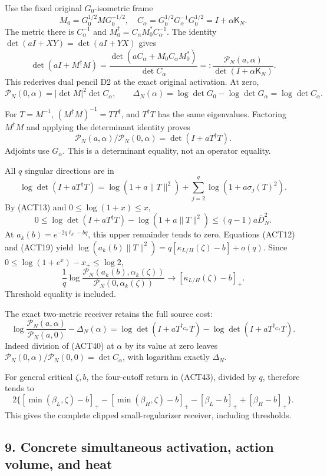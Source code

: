 \documentclass[11pt]{article}
\begin{document}
Use the fixed original \(G_0\)-isometric frame \[
M_0=G_0^{1/2}MG_0^{-1/2},\quad
C_\alpha=G_0^{1/2}G_\alpha^{-1}G_0^{1/2}=I+\alpha\mathsf K_N.
\] The metric there is \(C_\alpha^{-1}\) and \(M_0^\dagger=C_\alpha M_0^*C_\alpha^{-1}\). The identity \(\det(aI+XY)=\det(aI+YX)\) gives \[
\det(aI+M^\dagger M)
=\frac{\det(aC_\alpha+M_0C_\alpha M_0^*)}{\det C_\alpha}
=:\frac{\mathscr P_N(a,\alpha)}{\det(I+\alpha\mathsf K_N)}.
\tag{ACT38}
\] This rederives dual pencil D2 at the exact original activation. At zero, \[
\mathscr P_N(0,\alpha)=|\det M|^2\det C_\alpha,\qquad
\Delta_N(\alpha)=\log\det G_0-\log\det G_\alpha=\log\det C_\alpha.
\tag{ACT39}
\]

For \(T=M^{-1}\), \((M^\dagger M)^{-1}=TT^\dagger\), and \(T^\dagger T\) has the same eigenvalues. Factoring \(M^\dagger M\) and applying the determinant identity proves \[
\boxed{\mathscr P_N(a,\alpha)/\mathscr P_N(0,\alpha)=\det(I+aT^\dagger T).}
\tag{ACT40}
\] Adjoints use \(G_\alpha\). This is a determinant equality, not an operator equality.

All \(q\) singular directions are in \[
\log\det(I+aT^\dagger T)=\log(1+a\|T\|^2)
 +\sum_{j=2}^q\log(1+a\sigma_j(T)^2).
\] By (ACT13) and \(0\le\log(1+x)\le x\), \[
0\le\log\det(I+aT^\dagger T)-\log(1+a\|T\|^2)
\le(q-1)a\overline D_N^2.
\tag{ACT41}
\] At \(a_k(b)=e^{-2q\ell_k-bq}\), this upper remainder tends to zero. Equations (ACT12) and (ACT19) yield \(\log(a_k(b)\|T\|^2)=q[\kappa_{L/H}(\zeta)-b]+o(q)\). Since \(0\le\log(1+e^x)-x_+\le\log2\), \[
\boxed{\frac1q\log
\frac{\mathscr P_N(a_k(b),\alpha_k(\zeta))}
{\mathscr P_N(0,\alpha_k(\zeta))}
\longrightarrow[\kappa_{L/H}(\zeta)-b]_+.}
\tag{ACT42}
\] Threshold equality is included.

The exact two-metric receiver retains the full source cost: \[
\log\frac{\mathscr P_N(a,\alpha)}{\mathscr P_N(a,0)}-\Delta_N(\alpha)
=\log\det(I+aT^{\dagger_{G_\alpha}}T)
 -\log\det(I+aT^{\dagger_{G_0}}T).
\tag{ACT43}
\] Indeed division of (ACT40) at \(\alpha\) by its value at zero leaves \(\mathscr P_N(0,\alpha)/\mathscr P_N(0,0)=\det C_\alpha\), with logarithm exactly \(\Delta_N\).

For general critical \(\zeta,b\), the four-cutoff return in (ACT43), divided by \(q\), therefore tends to \[
2\bigl\{[\min(\beta_L,\zeta)-b]_+
-[\min(\beta_H,\zeta)-b]_+
-[\beta_L-b]_++[\beta_H-b]_+\bigr\}.
\tag{ACT44}
\] This gives the complete clipped small-regularizer receiver, including thresholds.

\subsection{9. Concrete simultaneous activation, action volume, and heat}\label{concrete-simultaneous-activation-action-volume-and-heat}
\end{document}
